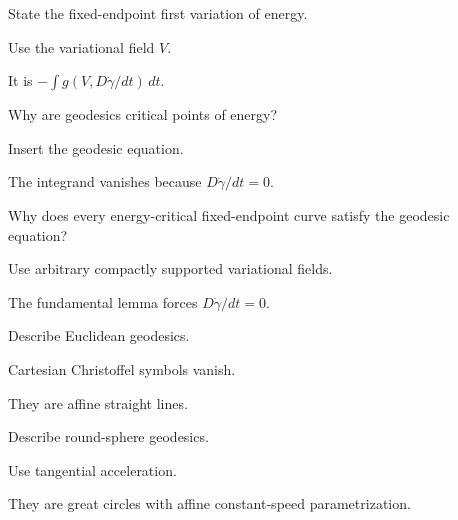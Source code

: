 \begin{exercise}\label{exr:vii23-18}
State the fixed-endpoint first variation of energy.
\end{exercise}
\begin{hint}
Use the variational field \(V\).
\end{hint}
\begin{solution}
It is \(-\int g(V,D\dot\gamma/dt)\,dt\).
\end{solution}


\begin{exercise}\label{exr:vii23-19}
Why are geodesics critical points of energy?
\end{exercise}
\begin{hint}
Insert the geodesic equation.
\end{hint}
\begin{solution}
The integrand vanishes because \(D\dot\gamma/dt=0\).
\end{solution}


\begin{exercise}\label{exr:vii23-20}
Why does every energy-critical fixed-endpoint curve satisfy the geodesic equation?
\end{exercise}
\begin{hint}
Use arbitrary compactly supported variational fields.
\end{hint}
\begin{solution}
The fundamental lemma forces \(D\dot\gamma/dt=0\).
\end{solution}


\begin{exercise}\label{exr:vii23-21}
Describe Euclidean geodesics.
\end{exercise}
\begin{hint}
Cartesian Christoffel symbols vanish.
\end{hint}
\begin{solution}
They are affine straight lines.
\end{solution}


\begin{exercise}\label{exr:vii23-22}
Describe round-sphere geodesics.
\end{exercise}
\begin{hint}
Use tangential acceleration.
\end{hint}
\begin{solution}
They are great circles with affine constant-speed parametrization.
\end{solution}


